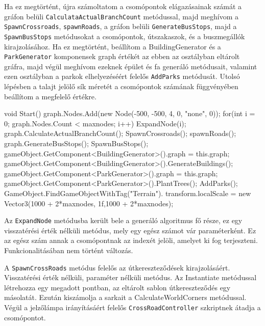 Ha ez megtörtént, újra számoltatom a csomópontok elágazásainak számát a gráfon belüli \texttt{CalculataActualBranchCount} metódussal, majd meghívom a \texttt{SpawnCrossroads}, \texttt{spawnRoads}, a gráfon belüli \texttt{GenerateBusStops}, majd a \texttt{SpawnBusStops} metódusokat a csomópontok, útszakaszok, és a buszmegállók kirajzolásához. Ha ez megtörtént, beállítom a BuildingGenerator és a \texttt{ParkGenerator} komponensek graph értékét az ebben az osztályban eltárolt gráfra, majd végül meghívom ezeknek épület és fa generáló metódusait, valamint ezen osztályban a parkok elhelyezéséért felelős \texttt{AddParks} metódusát. Utolsó lépésben a talajt jelölő sík méretét a csomópontok számának függvényében beállítom a megfelelő értékre.
\begin{cpp}
void Start()
    {
        graph.Nodes.Add(new Node(-500, -500, 4, 0, "none", 0));
        for(int i = 0; graph.Nodes.Count < maxnodes; i++)
        {
            ExpandNode(i);
        }
        graph.CalculateActualBranchCount();
        SpawnCrossroads();
        spawnRoads();
        graph.GenerateBusStops();
        SpawnBusStops();
        gameObject.GetComponent<BuildingGenerator>().graph = this.graph;
        gameObject.GetComponent<BuildingGenerator>().GenerateBuildings();
        gameObject.GetComponent<ParkGenerator>().graph = this.graph;
        gameObject.GetComponent<ParkGenerator>().PlantTrees();
        AddParks();
        GameObject.FindGameObjectWithTag("Terrain").
        transform.localScale = new Vector3(1000 + 2*maxnodes, 1f,1000 + 
        2*maxnodes);
    }
\end{cpp}
Az \texttt{ExpandNode} metódusba került bele a generáló algoritmus fő része, ez egy visszatérési érték nélküli metódus, mely egy egész számot vár paraméterként. Ez az egész szám annak a csomópontnak az indexét jelöli, amelyet ki fog terjeszteni. Funkcionalitásában nem történt változás.

A \texttt{SpawnCrossRoads} metódus felelős az útkereszteződések kirajzolásáért. Visszatérési érték nélküli, paraméter nélküli metódus. Az Instantiate metódussal létrehozza egy megadott pontban, az eltárolt sablon útkereszteződés egy másolatát. Ezután kiszámolja a sarkait a CalculateWorldCorners metódussal. Végül a jelzőlámpa irányításáért felelős \texttt{CrossRoadController} szkriptnek átadja a csomópontot.

